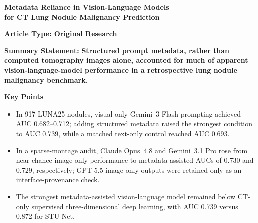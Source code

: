 \documentclass[11pt]{article}
\begin{document}
\doublespacing
\pagestyle{empty}  %


\begin{center}
{\LARGE\bfseries Metadata Reliance in Vision-Language Models\\
for CT Lung Nodule Malignancy Prediction\par}
\end{center}
\vspace{0.5em}

\begin{center}\textbf{Article Type: Original Research}\end{center}
\vspace{0.5em}

\noindent\textbf{Summary Statement:} \textbf{Structured prompt metadata, rather than computed tomography images alone, accounted for much of apparent vision-language-model performance in a retrospective lung nodule malignancy benchmark.}

\vspace{0.75em}
\noindent\textbf{Key Points}
\begin{itemize}
\item In 917 LUNA25 nodules, visual-only Gemini~3 Flash prompting achieved AUC 0.682--0.712; adding structured metadata raised the strongest condition to AUC 0.739, while a matched text-only control reached AUC 0.693.
\item In a sparse-montage audit, Claude Opus~4.8 and Gemini~3.1 Pro rose from near-chance image-only performance to metadata-assisted AUCs of 0.730 and 0.729, respectively; GPT-5.5 image-only outputs were retained only as an interface-provenance check.
\item The strongest metadata-assisted vision-language model remained below CT-only supervised three-dimensional deep learning, with AUC 0.739 versus 0.872 for STU-Net.
\end{itemize}
\end{document}
